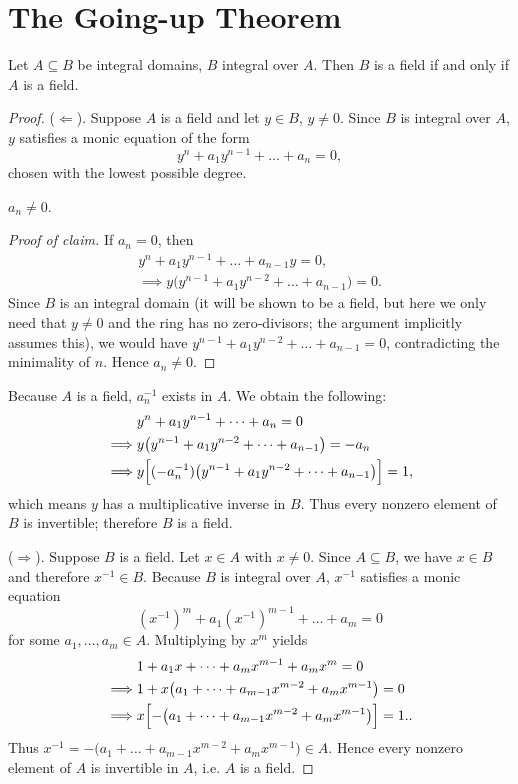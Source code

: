\section{The Going-up Theorem}
\begin{proposition}\label{prop:fieldCritIntDep}
  Let \( A \subseteq B \) be integral domains, \( B \) integral over  \( A \). Then  \( B \) is a field if and only if  \( A \) is a field.
\end{proposition}
\begin{proof}
  ($\Leftarrow$). Suppose \(A\) is a field and let \(y \in B\), \(y \neq 0\). Since \(B\) is integral over \(A\), \(y\) satisfies a monic equation of the form
\[
y^n + a_1 y^{n-1} + \dots + a_n = 0,
\]
chosen with the lowest possible degree.

\begin{claim}
  \(a_n \neq 0\).
\end{claim}
\begin{proof}[Proof of claim]
  If \(a_n = 0\), then
  \begin{gather*}
    y^n + a_1 y^{n-1} + \dots + a_{n-1} y = 0,\\
    \implies y\bigl(y^{n-1} + a_1 y^{n-2} + \dots + a_{n-1}\bigr) = 0.
  \end{gather*}
  Since \(B\) is an integral domain (it will be shown to be a field, but here we only need that \(y \neq 0\) and the ring has no zero‑divisors; the argument implicitly assumes this), we would have \(y^{n-1} + a_1 y^{n-2} + \dots + a_{n-1}=0\), contradicting the minimality of \(n\). Hence \(a_n \neq 0\).
\end{proof}
Because \(A\) is a field, \(a_n^{-1}\) exists in \(A\). We obtain the following:
\begin{align*}
  &y^n + a_1 y^{n-1} + \dots + a_n = 0\\
  \implies & y\bigl(y^{n-1} + a_1 y^{n-2} + \dots + a_{n-1}\bigr) = -a_n\\
  \implies &y\Bigl[(-a_n^{-1})\bigl(y^{n-1} + a_1 y^{n-2} + \dots + a_{n-1}\bigr)\Bigr] = 1,
\end{align*}
which means \(y\) has a multiplicative inverse in \(B\). Thus every nonzero element of \(B\) is invertible; therefore \(B\) is a field.

($\Rightarrow$). Suppose \(B\) is a field. Let \(x \in A\) with \(x \neq 0\). Since \(A \subseteq B\), we have \(x \in B\) and therefore \(x^{-1} \in B\). Because \(B\) is integral over \(A\), \(x^{-1}\) satisfies a monic equation
\[
(x^{-1})^m + a_1 (x^{-1})^{m-1} + \dots + a_m = 0
\]
for some \(a_1,\dots,a_m \in A\). Multiplying by \(x^m\) yields
\begin{align*}
  &1 + a_1 x + \dots + a_m x^{m-1} + a_m x^m = 0\\
  \implies & 1 + x\bigl(a_1 + \dots + a_{m-1} x^{m-2} + a_m x^{m-1}\bigr) = 0\\
  \implies &x\Bigl[-\bigl(a_1 + \dots + a_{m-1} x^{m-2} + a_m x^{m-1}\bigr)\Bigr] = 1.
.\end{align*}
Thus \(x^{-1} = -\bigl(a_1 + \dots + a_{m-1} x^{m-2} + a_m x^{m-1}\bigr) \in A\). Hence every nonzero element of \(A\) is invertible in \(A\), i.e. \(A\) is a field.
\end{proof}
